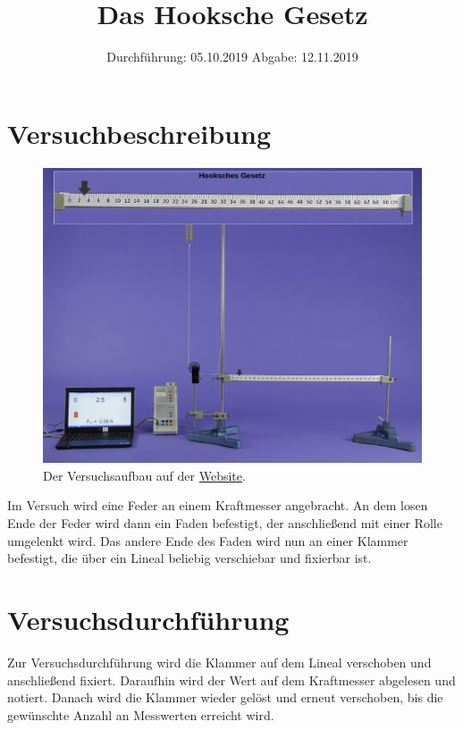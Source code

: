 

\subject{V802}
\title{Das Hooksche Gesetz}
\date{%
  Durchführung: 05.10.2019
  \hspace{3em}
  Abgabe: 12.11.2019
}


\maketitle
\thispagestyle{empty}
\tableofcontents
\newpage

 \section{Versuchbeschreibung}
\begin{figure}
  \centering
  \includegraphics[width=\textwidth]{content/Hooksche_Gesetzt.png}
  \caption{Der Versuchsaufbau auf der \href{http://hyperion.didaktik.physik.uni-due.de/IBEs/Hooke.php}{Website}.}
  \label{fig:Versuchsaufbau}
\end{figure}
Im Versuch wird eine Feder an einem Kraftmesser angebracht. An dem losen Ende der Feder
wird dann ein Faden befestigt, der anschließend mit einer Rolle umgelenkt wird. 
Das andere Ende des Faden wird nun an einer Klammer befestigt,
die über ein Lineal beliebig verschiebar und fixierbar ist.
  \section{Versuchsdurchführung}
Zur Versuchsdurchführung wird die Klammer auf dem Lineal verschoben und anschließend fixiert.
Daraufhin wird der Wert auf dem Kraftmesser abgelesen und notiert.
Danach wird die Klammer wieder gelöst und erneut verschoben, bis die gewünschte Anzahl an Messwerten erreicht wird.

